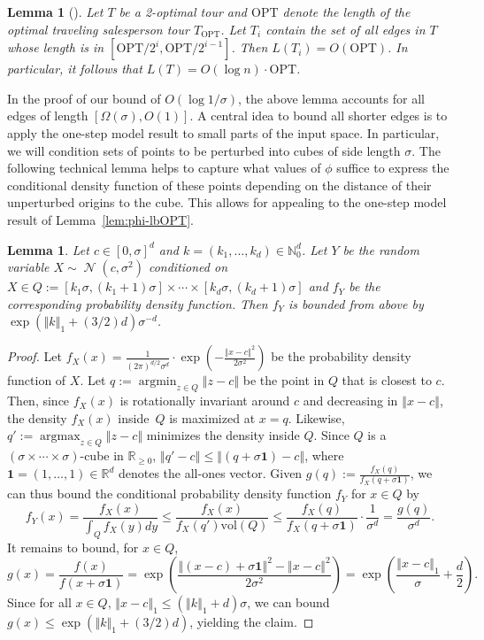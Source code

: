 \documentclass[11pt,DIV=12,a4paper]{scrartcl}
\newtheorem{lemma}[claim]{Lemma}
\newcommand{\real}{\ensuremath{\mathbb{R}}}
\newcommand{\one}{\mathbf{1}}
\newcommand{\vol}{\mathrm{vol}}
\DeclareMathOperator{\argmin}{argmin}
\DeclareMathOperator{\argmax}{argmax}
\newcommand{\norm}[1]{\left\Vert #1 \right\Vert}
\DeclareMathOperator{\Gauss}{\mathcal{N}}
\newcommand{\OPT}{\mathrm{OPT}}
\begin{document}
\begin{lemma}[]\label{lem:logworstcase}
Let $T$ be a 2-optimal tour and $\OPT$ denote the length of the optimal traveling salesperson tour $T_\OPT$. Let $T_i$ contain the set of all edges in $T$ whose length is in $[\OPT/2^i,\OPT/2^{i-1}]$. Then $L(T_i) = O(\OPT)$. In particular, it follows that $L(T)= O(\log n)\cdot \OPT$.
\end{lemma}

In the proof of our bound of $O(\log 1/\sigma)$, the above lemma accounts for all edges of length $[\Omega(\sigma),O(1)]$.
A central idea to bound all shorter edges is to apply the one-step model result to small parts of the input space. In particular, we will condition sets of points to be perturbed into cubes of side length $\sigma$. The following technical lemma helps to capture what values of $\phi$ suffice to express the conditional density function of these points depending on the distance of their unperturbed origins to the cube. This allows for appealing to the one-step model result of Lemma~\ref{lem:phi-lbOPT}.

\begin{lemma}\label{lem:squaredens}
Let $c\in [0,\sigma]^d$ and $k=(k_1,\dots,k_d) \in \mathbb{N}_0^d$. Let $Y$ be the random variable $X\sim \Gauss(c,\sigma^2)$ conditioned on $X \in Q:=[k_1\sigma,(k_1+1)\sigma]\times \cdots \times[k_d\sigma,(k_d+1)\sigma]$ and $f_Y$ be the corresponding probability density function. Then $f_Y$ is bounded from above by $\exp(\norm{k}_1+(3/2)d)\sigma^{-d}$.
\end{lemma}
\begin{proof}
Let $f_X(x)=\frac{1}{(2\pi)^{d/2}\sigma^d}\cdot \exp(-\frac{\norm{x-c}^2}{2\sigma^2})$ be the probability density function of $X$. Let $q:=\argmin_{z\in Q} \norm{z-c}$ be the point in $Q$ that is closest to $c$. Then, since $f_X(x)$ is rotationally invariant around $c$ and decreasing in $\norm{x-c}$, the density $f_X(x)$ inside~$Q$ is maximized at $x=q$. Likewise, $q':=\argmax_{z\in Q}\norm{z-c}$ minimizes the density inside $Q$. Since $Q$ is a $(\sigma\times \cdots \times \sigma)$-cube in $\mathbb{R}_{\ge 0}$, $\norm{q'-c} \le \norm{(q + \sigma \one)-c}$, where $\one= (1,\dots,1) \in \real^d$ denotes the all-ones vector. Given $g(q):=\frac{f_X(q)}{f_X(q+\sigma \one)}$, we can thus bound the conditional probability density function $f_Y$ for $x\in Q$ by
\[f_Y(x) = \frac{f_X(x)}{\int_Q f_X(y) dy} \le \frac{f_X(x)}{f_X(q')\vol(Q)} \le \frac{f_X(q)}{f_X(q+\sigma \one)}\cdot \frac{1}{\sigma^d} =\frac{g(q)}{\sigma^d}.\]
It remains to bound, for $x\in Q$, 
\[g(x) = \frac{f(x)}{f(x+\sigma \one)} =  \exp\left(\frac{\norm{(x-c)+\sigma \one}^2-\norm{x-c}^2}{2\sigma^2}\right) = \exp\left(\frac{\norm{x-c}_1}{\sigma}+\frac{d}{2}\right).\]
Since for all $x\in Q$, $\norm{x-c}_1 \le (\norm{k}_1 + d)\sigma$, we can bound $g(x)\le \exp(\norm{k}_1 + (3/2)d)$, yielding the claim.
\end{proof}
\end{document}
